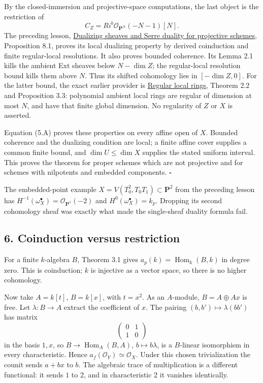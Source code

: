 \documentclass[11pt]{article}
\begin{document}
By the closed-immersion and projective-space computations, the last
object is the restriction of \[
C_Z=Ri^b\mathcal O_{\mathbf P^N}(-N-1)[N].
\] The preceding lesson,
\href{dualizing-sheaves-and-serre-duality-for-projective-schemes.md}{Dualizing
sheaves and Serre duality for projective schemes}, Proposition 8.1,
proves its local dualizing property by derived coinduction and finite
regular-local resolutions. It also proves bounded coherence. Its Lemma
2.1 kills the ambient Ext sheaves below \(N-\dim Z\); the regular-local
resolution bound kills them above \(N\). Thus its shifted cohomology
lies in \([-\dim Z,0]\). For the latter bound, the exact earlier
provider is \href{../AG-CA/AG-CA-14.html}{Regular local rings}, Theorem
2.2 and Proposition 3.3: polynomial ambient local rings are regular of
dimension at most \(N\), and have that finite global dimension. No
regularity of \(Z\) or \(X\) is asserted.

Equation (5.A) proves these properties on every affine open of \(X\).
Bounded coherence and the dualizing condition are local; a finite affine
cover supplies a common finite bound, and \(\dim U\leq\dim X\) supplies
the stated uniform interval. This proves the theorem for proper schemes
which are not projective and for schemes with nilpotents and embedded
components. \(\square\)

The embedded-point example \(X=V(T_0^2,T_0T_1)\subset\mathbf P^2\) from
the preceding lesson has
\(H^{-1}(\omega_X^\bullet)=\mathcal O_{\mathbf P^1}(-2)\) and
\(H^0(\omega_X^\bullet)=k_p\). Dropping its second cohomology sheaf was
exactly what made the single-sheaf duality formula fail.

\subsection{6. Coinduction versus
restriction}\label{coinduction-versus-restriction}

For a finite \(k\)-algebra \(B\), Theorem 3.1 gives
\(a_p(k)=\operatorname{Hom}_k(B,k)\) in degree zero. This is
coinduction; \(k\) is injective as a vector space, so there is no higher
cohomology.

Now take \(A=k[t]\), \(B=k[x]\), with \(t=x^2\). As an \(A\)-module,
\(B=A\oplus Ax\) is free. Let \(\lambda:B\to A\) extract the coefficient
of \(x\). The pairing \((b,b')\mapsto\lambda(bb')\) has matrix \[
\begin{pmatrix}0&1\\1&0\end{pmatrix}
\] in the basis \(1,x\), so \(B\to\operatorname{Hom}_A(B,A)\),
\(b\mapsto b\lambda\), is a \(B\)-linear isomorphism in every
characteristic. Hence \(a_f(\mathcal O_Y)\simeq\mathcal O_X\). Under
this chosen trivialization the counit sends \(a+bx\) to \(b\). The
algebraic trace of multiplication is a different functional: it sends
\(1\) to \(2\), and in characteristic 2 it vanishes identically.
\end{document}
